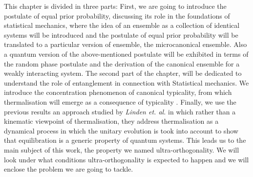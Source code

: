 \indent This chapter is divided in three parts: First, we are going to introduce the postulate of equal prior probability, discussing its role in the foundations of statistical mechanics, where the idea of an ensemble as a collection of identical systems will be introduced and the postulate of equal prior probability will be translated  to a particular version of ensemble, the microcanonical ensemble. Also a quantum version of the above-mentioned postulate will be exhibited in terms of the random phase postulate \cite{landau_statistical_2013} and the derivation of the canonical ensemble for a weakly interacting system. The second part of the chapter, will be dedicated to understand the role of entanglement in connection with Statistical mechanics. We introduce the concentration phenomenon of canonical typicality, from which thermalisation will emerge as a consequence of typicality \cite{popescu_entanglement_2006, popescu_foundations_2005}. Finally, we use the previous results an approach studied by \textit{Linden et. al.} \cite{linden_quantum_2009} in which rather than a kinematic viewpoint of thermalisation, they address thermalisation as a dynamical process in which the unitary evolution is took into account to show that  equilibration is a generic property of quantum systems. This leads us to the main subject of this work, the property we named ultra-orthogonality. We will look under what conditions ultra-orthogonality is expected to happen and we will enclose the problem we are going to tackle.


